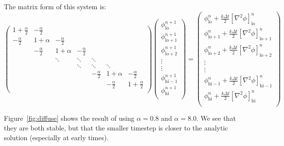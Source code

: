 The matrix form of this system is:
\newcommand{\atwo}{\frac{\alpha}{2}}
\begin{equation}
\renewcommand\arraystretch{1.5}
\left (
\begin{array}{ccccccc}
1+\atwo &   -\atwo &          &        &        &           &          \\
-\atwo  & 1+\alpha & -\atwo   &        &        &           &          \\
        &   -\atwo & 1+\alpha & -\atwo &        &           &          \\
        &          & \ddots   & \ddots & \ddots &           &          \\
        &          &          & \ddots & \ddots & \ddots    &          \\
        &          &          &        & -\atwo & 1+\alpha  &-\atwo   \\
        &          &          &        &        & -\atwo    &1+\atwo \\
\end{array}
\right )
\left (
\begin{array}{c}
\phi_\mathrm{lo}^{n+1} \\
\phi_\mathrm{lo+1}^{n+1} \\
\phi_\mathrm{lo+2}^{n+1} \\
\vdots \\
\vdots \\
\phi_\mathrm{hi-1}^{n+1} \\
\phi_\mathrm{hi}^{n+1} \\
\end{array}
\right )
=
\left (
\begin{array}{c}
\phi_\mathrm{lo}^{n}  + \frac{k\Delta t}{2} [\nabla^2 \phi]^n_\mathrm{lo}\\
\phi_\mathrm{lo+1}^{n} + \frac{k\Delta t}{2} [\nabla^2 \phi]^n_\mathrm{lo+1} \\
\phi_\mathrm{lo+2}^{n} + \frac{k\Delta t}{2} [\nabla^2 \phi]^n_\mathrm{lo+2}\\
\vdots \\
\vdots \\
\phi_\mathrm{hi-1}^{n} + \frac{k\Delta t}{2} [\nabla^2 \phi]^n_\mathrm{hi-1}\\
\phi_\mathrm{hi}^{n} + \frac{k\Delta t}{2} [\nabla^2 \phi]^n_\mathrm{hi}\\
\end{array}
\right )
\end{equation}

Figure~\ref{fig:diffuse} shows the result of using $\alpha = 0.8$ and $\alpha = 8.0$.  We 
see that they are both stable, but that the smaller timestep is closer to the analytic
solution (especially at early times).

